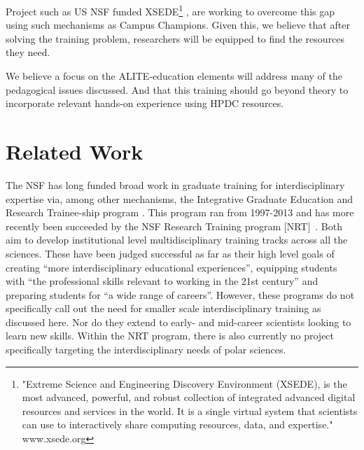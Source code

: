 \documentclass[conference]{IEEEtran}
\begin{document}
\begin{enumerate}[\setlength{\listparindent}{\parindent}]
Project such as US NSF funded XSEDE\footnote{"Extreme Science and Engineering Discovery Environment (XSEDE), is the most advanced, powerful, and robust collection of integrated advanced digital resources and services in the world. It is a single virtual system that scientists can use to interactively share computing resources, data, and expertise." www.xsede.org} \cite{noauthor_undated-lh}, are working to overcome this gap using such mechanisms as Campus Champions.  Given this, we believe that after solving the training problem, researchers will be equipped to find the resources they need. \end{enumerate} We believe a focus on the ALITE-education elements will address many of the pedagogical issues discussed.  And that this training should go beyond theory to incorporate relevant hands-on experience using HPDC resources.

\section{Related Work}
The NSF has long funded broad work in graduate training for interdisciplinary expertise via, among other mechanisms, the Integrative Graduate Education and Research Trainee-ship program \cite{noauthor_undated-bu}.  This program ran from 1997-2013 and has more recently been succeeded by the NSF Research Training program [NRT]~\cite{NRT}.  Both aim to develop institutional level multidisciplinary training tracks across all the sciences. These have been judged successful as far as their high level goals of creating ``more interdisciplinary educational experiences'', equipping students with ``the professional skills relevant to working in the 21st century'' and preparing students for ``a wide range of careers''\cite{National2006}. However, these programs do not specifically call out the need for smaller scale interdisciplinary training as discussed here.  Nor do they extend to early- and mid-career scientists looking to learn new skills. Within the NRT program, there is also currently no project specifically targeting the interdisciplinary needs of polar sciences.
\end{document}
